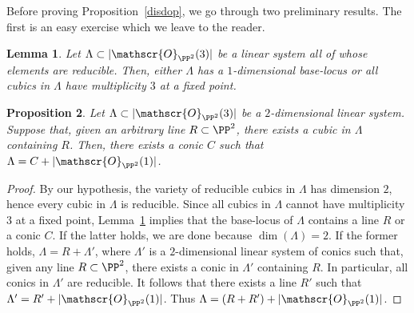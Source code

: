 \documentclass[JEP,XML,SOM,Unicode, NoEqCountersInSection,NoFloatCountersInSection]{cedram}
\let\mathcal\mathscr
\newtheorem{lemm}{Lemma}[section]
\newtheorem{prop}[lemm]{Proposition}
\theoremstyle{definition}
\newcommand\cO{\mathcal{O}}\let\OO\cO
\begin{document}
Before proving Proposition~\ref{disdop}, we go through two preliminary results. The first is an easy exercise which we leave to the reader.

\begin{lemm}\label{tuttired}
Let $\Lambda\subset|\cO_{\PP^2}(3)|$ be a linear system all of whose elements are reducible. Then, either $\Lambda$ has a $1$-dimensional base-locus or all cubics in $\Lambda$ have multiplicity $3$ at a fixed point.
\end{lemm}

\begin{prop}\label{quadsig}
Let $\Lambda\subset|\cO_{\PP^2}(3)|$ be a $2$-dimensional linear system.
Suppose that, given an arbitrary line $R\subset\PP^2$, there exists a cubic in $\Lambda$ containing $R$. Then, there exists a conic $C$ such that $\Lambda=C+|\cO_{\PP^2}(1)|$.
\end{prop}

\begin{proof}
By our hypothesis, the variety of reducible cubics in $\Lambda$ has dimension $2$, hence every cubic in $\Lambda$ is reducible. Since all cubics in $\Lambda$ cannot have multiplicity $3$ at a fixed point,
Lemma~\ref{tuttired} implies that the base-locus of $\Lambda$ contains a line $R$ or a conic $C$. If the latter holds, we are done because $\dim(\Lambda)=2$. If the former holds,
$\Lambda=R+\Lambda'$, where $\Lambda'$ is a $2$-dimensional linear system of conics such that, given any line $R\subset\PP^2$, there exists a conic in $\Lambda'$ containing $R$. In particular, all conics in $\Lambda'$ are reducible. It follows that there exists a line $R'$ such that $\Lambda'=R'+|\cO_{\PP^2}(1)|$. Thus $\Lambda=(R+R')+|\cO_{\PP^2}(1)|$.
\end{proof}
\end{document}
